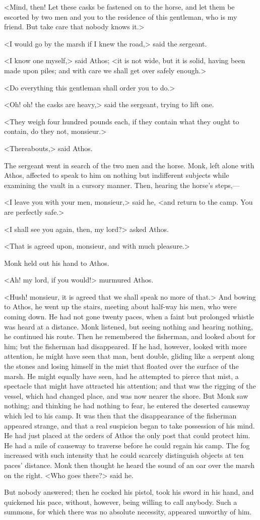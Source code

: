 <Mind, then! Let these casks be fastened on to the horse, and let them be escorted by two men and you to the residence of this gentleman, who is my friend. But take care that nobody knows it.>

<I would go by the marsh if I knew the road,> said the sergeant.

<I know one myself,> said Athos; <it is not wide, but it is solid, having been made upon piles; and with care we shall get over safely enough.>

<Do everything this gentleman shall order you to do.>

<Oh! oh! the casks are heavy,> said the sergeant, trying to lift one.

<They weigh four hundred pounds each, if they contain what they ought to contain, do they not, monsieur.>

<Thereabouts,> said Athos.

The sergeant went in search of the two men and the horse. Monk, left alone with Athos, affected to speak to him on nothing but indifferent subjects while examining the vault in a cursory manner. Then, hearing the horse's steps,—

<I leave you with your men, monsieur,> said he, <and return to the camp. You are perfectly safe.>

<I shall see you again, then, my lord?> asked Athos.

<That is agreed upon, monsieur, and with much pleasure.>

Monk held out his hand to Athos.

<Ah! my lord, if you would!> murmured Athos.

<Hush! monsieur, it is agreed that we shall speak no more of that.> And bowing to Athos, he went up the stairs, meeting about half-way his men, who were coming down. He had not gone twenty paces, when a faint but prolonged whistle was heard at a distance. Monk listened, but seeing nothing and hearing nothing, he continued his route. Then he remembered the fisherman, and looked about for him; but the fisherman had disappeared. If he had, however, looked with more attention, he might have seen that man, bent double, gliding like a serpent along the stones and losing himself in the mist that floated over the surface of the marsh. He might equally have seen, had he attempted to pierce that mist, a spectacle that might have attracted his attention; and that was the rigging of the vessel, which had changed place, and was now nearer the shore. But Monk saw nothing; and thinking he had nothing to fear, he entered the deserted causeway which led to his camp. It was then that the disappearance of the fisherman appeared strange, and that a real suspicion began to take possession of his mind. He had just placed at the orders of Athos the only post that could protect him. He had a mile of causeway to traverse before he could regain his camp. The fog increased with such intensity that he could scarcely distinguish objects at ten paces' distance. Monk then thought he heard the sound of an oar over the marsh on the right. <Who goes there?> said he.

But nobody answered; then he cocked his pistol, took his sword in his hand, and quickened his pace, without, however, being willing to call anybody. Such a summons, for which there was no absolute necessity, appeared unworthy of him. 